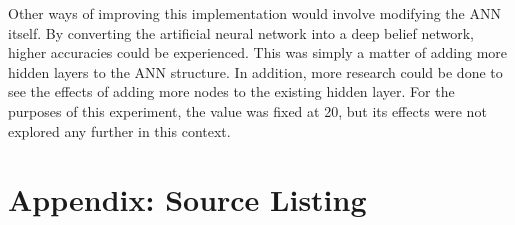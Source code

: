 \documentclass{article}
\begin{document}
Other ways of improving this implementation would involve modifying the ANN itself. By converting the artificial neural network into a deep belief network, higher accuracies could be experienced. This was simply a matter of adding more hidden layers to the ANN structure. In addition, more research could be done to see the effects of adding more nodes to the existing hidden layer. For the purposes of this experiment, the value was fixed at 20, but its effects were not explored any further in this context.




\newpage
\onecolumn
\appendix
\section{Appendix: Source Listing}
\label{sec:source}







\end{document}

